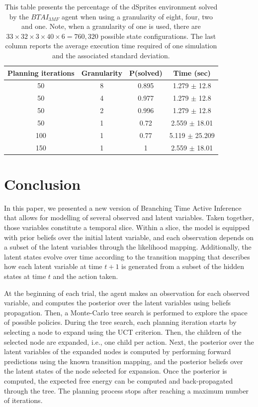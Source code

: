 \documentclass[twoside,11pt]{article}
\begin{document}
\begin{table}[H]
\centering
\begin{tabular}{ |c|c|c|c| }
 \hline
 Planning iterations & Granularity & P(solved) & Time (sec) \\
 \hline
 50 & 8 & 0.895 & 1.279 $\pm$ 12.8 \\
 \hline
 50 & 4 & 0.977 & 1.279 $\pm$ 12.8 \\
 \hline
 50 & 2 & 0.996 & 1.279 $\pm$ 12.8 \\
 \hline
 50 & 1 & 0.72 & 2.559 $\pm$ 18.01 \\
 \hline
 100 & 1 & 0.77 & 5.119 $\pm$ 25.209 \\
 \hline
 150 & 1 & 1 & 2.559 $\pm$ 18.01 \\
 \hline
\end{tabular}
\caption{This table presents the percentage of the dSprites environment solved by the $BTAI_{3MF}$ agent when using a granularity of eight, four, two and one. Note, when a granularity of one is used, there are $33 \times 32 \times 3 \times 40 \times 6 = 760,320$ possible state configurations. The last column reports the average execution time required of one simulation and the associated standard deviation.}
\label{tab:btai_3mf_dSprites_res}
\end{table}

\section{Conclusion} \label{sec:conclusion}

In this paper, we presented a new version of Branching Time Active Inference that allows for modelling of several observed and latent variables. Taken together, those variables constitute a temporal slice. Within a slice, the model is equipped with prior beliefs over the initial latent variable, and each observation depends on a subset of the latent variables through the likelihood mapping. Additionally, the latent states evolve over time according to the transition mapping that describes how each latent variable at time $t+1$ is generated from a subset of the hidden states at time $t$ and the action taken.

At the beginning of each trial, the agent makes an observation for each observed variable, and computes the posterior over the latent variables using beliefs propagation. Then, a Monte-Carlo tree search is performed to explore the space of possible policies. During the tree search, each planning iteration starts by selecting a node to expand using the UCT criterion. Then, the children of the selected node are expanded, i.e., one child per action. Next, the posterior over the latent variables of the expanded nodes is computed by performing forward predictions using the known transition mapping, and the posterior beliefs over the latent states of the node selected for expansion. Once the posterior is computed, the expected free energy can be computed and back-propagated through the tree. The planning process stops after reaching a maximum number of iterations.
\end{document}
